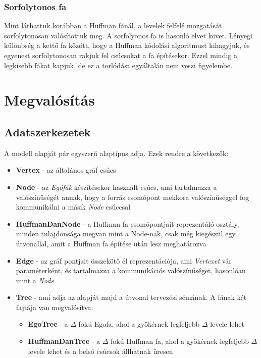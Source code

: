 \documentclass[12pt]{report}
\begin{document}
\subsection{Sorfolytonos fa}

Mint láthattuk korábban a Huffman fánál, a levelek felfelé mozgatását sorfolytonosan valósítottuk meg. A sorfolyonos fa is hasonló elvet követ.
Lényegi különbség a kettő fa között, hogy a Huffman kódolási algoritmust kihagyjuk, és egyenest sorfolytonosan rakjuk fel csúcsokat a fa építésekor.
Ezzel mindig a legkisebb fákat kapjuk, de ez a torlódást egyáltalán nem veszi figyelembe.

\chapter{Megvalósítás}


\section{Adatszerkezetek}

A modell alapját pár egyszerű alaptípus adja. Ezek rendre a következők:
\begin{itemize}
	\item \textbf{Vertex} - az általános gráf csúcs
	\item \textbf{Node} - az \textit{Egófák} készítésekor használt csúcs, ami tartalmazza a valószínűségét annak, hogy a forrás csomópont mekkora valószínűséggel fog kommunikálni a másik \textit{Node} csúccsal
	\item \textbf{HuffmanDanNode} - a Huffman fa csomópontjait reprezentáló osztály, minden tulajdonsága megvan mint a Node-nak, csak még kiegészül egy útvonallal, amit a Huffman fa építése után lesz meghatározva
	\item \textbf{Edge} - az gráf pontjait összekötő él reprezentációja, ami \textit{Vertexet} vár paraméterként, és tartalmazza a kommunikációs valószínűséget, hasonlóan mint a \textit{Node}
	\item \textbf{Tree} - ami adja az alapját majd a útvonal tervezési sémának. A fának két fajtája van megvalósítva:
	\begin{itemize}
		\item \textbf{EgoTree} - a $\Delta$ fokú Egofa, ahol a gyökérnek legfeljebb $\Delta$ levele lehet
		\item \textbf{HuffmanDanTree} - a $\Delta$ fokú Huffman fa, ahol a gyökérnek legfeljebb $\Delta$ levele lehet és a belső csúcsok állhatnak üresen
	\end{itemize}

	
\end{itemize}
	
\end{document}
